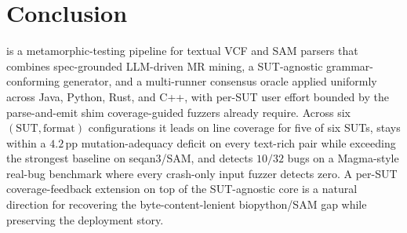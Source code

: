 \section{Conclusion}
\label{sec:conclusion}

\biotest{} is a metamorphic-testing pipeline for textual VCF and
SAM parsers that combines spec-grounded LLM-driven MR mining, a
SUT-agnostic grammar-conforming generator, and a multi-runner
consensus oracle applied uniformly across Java, Python, Rust, and
C++, with per-SUT user effort bounded by the parse-and-emit shim
coverage-guided fuzzers already require. Across six $(\mathrm{SUT,
format})$ configurations it leads on line coverage for five of
six SUTs, stays within a $4.2$\,pp mutation-adequacy deficit on
every text-rich pair while exceeding the strongest baseline on
seqan3/SAM, and detects $10/32$ bugs on a Magma-style real-bug
benchmark where every crash-only input fuzzer detects zero. A
per-SUT coverage-feedback extension on top of the SUT-agnostic
core is a natural direction for recovering the
byte-content-lenient biopython/SAM gap while preserving the
deployment story.
